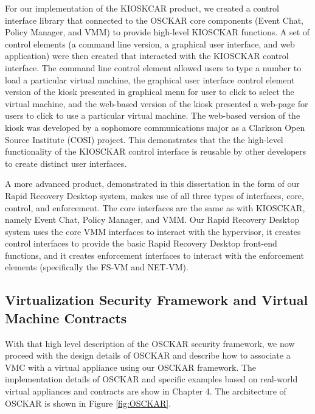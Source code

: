 
For our implementation of the KIOSKCAR product, we created a control interface library that connected to the OSCKAR core components (Event Chat, Policy Manager, and VMM) to provide high-level KIOSCKAR functions. A set of control elements (a command line version, a graphical user interface, and web application) were then created that interacted with the KIOSCKAR control interface. The command line control element allowed users to type a number to load a particular virtual machine, the graphical user interface control element version of the kiosk presented in graphical menu for user to click to select the virtual machine, and the web-based version of the kiosk presented a web-page for users to click to use a particular virtual machine. The web-based version of the kiosk was developed by a sophomore communications major as a Clarkson Open Source Institute (COSI) project. This demonstrates that the the high-level functionality of the KIOSCKAR control interface is reusable by other developers to create distinct user interfaces.

A more advanced product, demonstrated in this dissertation in the form of our Rapid Recovery Desktop system, makes use of all three types of interfaces, core, control, and enforcement. The core interfaces are the same as with KIOSCKAR, namely Event Chat, Policy Manager, and VMM. Our Rapid Recovery Desktop system uses the core VMM interfaces to interact with the hypervisor, it creates control interfaces to provide the basic Rapid Recovery Desktop front-end functions, and it creates enforcement interfaces to interact with the enforcement elements (specifically the FS-VM and NET-VM).

\subsection{Virtualization Security Framework and Virtual Machine Contracts}
With that high level description of the OSCKAR security framework, we now proceed with the design details of OSCKAR and describe how to associate a VMC with a virtual appliance using our OSCKAR framework. The implementation details of OSCKAR and specific examples based on real-world virtual appliances and contracts are show in Chapter 4. The architecture of OSCKAR is shown in Figure \ref{fig:OSCKAR}.

